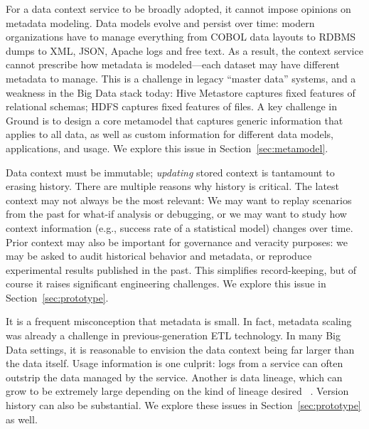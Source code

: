 \documentclass{sig-alternate}
\begin{document}
 For a data context service to be broadly adopted, it cannot impose opinions on metadata modeling. 
Data models evolve and persist over time: modern organizations have to manage everything from COBOL data layouts to RDBMS dumps to XML, JSON, Apache logs and free text. 
As a result, the context service cannot 
prescribe 
how metadata is modeled---each dataset may have different metadata to manage. 
This is a challenge in legacy ``master data'' systems, and  a weakness in the Big Data stack today: Hive Metastore captures fixed features of relational schemas; HDFS captures fixed features of files.  
A key challenge in Ground is to design a core metamodel that captures generic information that applies to all data, as well as custom information for different data models, applications, and usage.
We explore this issue in Section~\ref{sec:metamodel}.

 Data context must be immutable; \emph{updating} stored context is tantamount to erasing history. %
There are multiple reasons why history is critical. 
The latest context may not always be the most relevant: We may want to replay scenarios from the past for what-if analysis or debugging, or we may want to study how context information (e.g., success rate of a statistical model) changes over time.
Prior context may also be important for governance and veracity purposes: we may be asked to audit historical behavior and metadata, or reproduce experimental results published in the past. 
This simplifies record-keeping, but of course it raises significant engineering challenges.  
We explore this issue in Section~\ref{sec:prototype}.

 It is a frequent misconception that metadata is small. In fact, metadata scaling was already a challenge in previous-generation ETL technology. In many Big Data settings, it is reasonable to envision the data context being far larger than the data itself. Usage information is one culprit:  logs from a service can often outstrip the data managed by the service. Another is data lineage, which can grow to be extremely large
depending on the kind of lineage desired
~\cite{cheney2009provenance}.  Version history can also be substantial. 
We explore these issues in Section~\ref{sec:prototype} as well.
\end{document}
